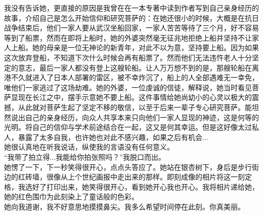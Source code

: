 \documentclass[letterpaper, 12pt]{article}
\begin{document}
\begin{multicols}{2}
我没有告诉她，更直接的原因是我曾在在一本专著中读到作者写到自己亲身经历的故事，介绍自己是怎么开始信仰和研究菩萨的：在她还很小的时候，大概是在抗日战争结束后，他们一家人要从武汉坐船回家，一家人苦苦等待了三个月，好不容易等到了船票，然而在即将上船时，她的外婆突然毫无征兆地拒绝上船并坚持不让家人上船。她的母亲是一位无神论的新青年，对此不以为意，坚持要上船。因为如果这次放弃登船，不知道下次什么时候会再有船票了。然而他们无法违忤老人十分坚定的意志，最后一家人都没有登上这艘轮船。让人万万想不到的是，那艘轮船在离港不久就进入了日本人部署的雷区，被不幸炸沉了，船上的人全部遇难无一幸免，唯他们一家逃过了这场劫难。她的外婆，一位虔诚的信徒，解释说，她当时看见菩萨显现在长江之中，摆手示意她不要上船。这件事情给她尚幼小的心灵以极大的震撼，从此就对菩萨生起了坚定不移的敬信，以至于后来一辈子专心研究菩萨。能坦然说出自己的亲身经历，向众人共享本来只向他们一家人显现的神迹，这是何等的光明。将自己的信仰与学术前途结合在一起，这又是何其幸运。但是这好像太过私人，暴露了太多自我，也许她也对此不感兴趣，如果之后有机会...\\

她很认真地在听我说话，纵使我的言语没有任何意义。\\

“我带了拍立得...我能给你拍张照吗？”我脱口而出。\\

她愣了一下，下一秒笑得很开心，点点头答应了。她站在银杏树下，身后是步行街边的红砖墙，很像从上个世纪画报中走出来的那样。即刻成像的相片将这一刻定格，我选好了打印出来，她笑得很开心，看到她开心我也开心。我将相片递给她，她的红色围巾为此刻染上了童话般的色彩。\\

她向我道谢，我不好意思地摸摸鼻尖。我多么希望时间停在此刻。你真美丽。\\

\end{multicols} 
\end{document}
